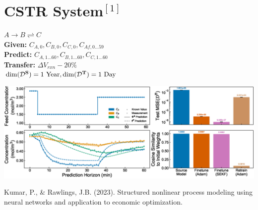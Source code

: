 \documentclass[a0paper,fleqn]{betterposter}
\newcommand{\source}{\mathrm{\bf{S}}}
\newcommand{\target}{\mathrm{\bf{T}}}
\newcommand{\D}{\mathcal{D}}
\newcommand{\sourceD}{\D^\source}
\newcommand{\targetD}{\D^\target}
\newcommand{\footnoteSize}{\fontsize{18}{20} \selectfont}
\begin{document}
{\section{CSTR System$^\mathrm{[1]}$}
$A \rightarrow B \rightleftharpoons C$\\
\textbf{Given:} $C_{A,0}, C_{B,0}, C_{C,0}, C_{Af,0 \ldots 59}$ \hspace{1em} \\\textbf{Predict:} $C_{A,1 \ldots 60}, C_{B,1 \ldots 60}, C_{C,1 \ldots 60}$\\
\textbf{Transfer:} $\Delta V_{rxn} -20\%$\\
$\dim(\sourceD)=1 \text{ Year}, \dim(\targetD)=1\text{ Day}$
\begin{center}
    \includegraphics[width=\textwidth]{img/CSTRResults}
\end{center}




{\footnoteSize [1] Kumar, P., \& Rawlings, J.B. (2023). Structured nonlinear process modeling using neural networks and application to economic optimization. %
\par
}

}{
\vfill

}
\end{document}
